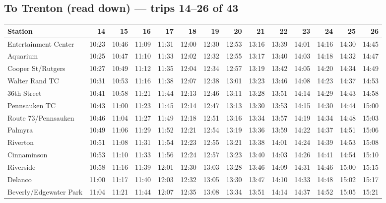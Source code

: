 \subsection*{To Trenton (read down) --- trips 14--26 of 43}
\begin{center}\footnotesize\setlength{\tabcolsep}{3pt}\begin{tabular}{@{}lrrrrrrrrrrrrr@{}}\toprule
Station & 14 & 15 & 16 & 17 & 18 & 19 & 20 & 21 & 22 & 23 & 24 & 25 & 26 \\\midrule
Entertainment Center & 10:23 & 10:46 & 11:09 & 11:31 & 12:00 & 12:30 & 12:53 & 13:16 & 13:39 & 14:01 & 14:16 & 14:30 & 14:45 \\
Aquarium & 10:25 & 10:47 & 11:10 & 11:33 & 12:02 & 12:32 & 12:55 & 13:17 & 13:40 & 14:03 & 14:18 & 14:32 & 14:47 \\
Cooper St/Rutgers & 10:27 & 10:49 & 11:12 & 11:35 & 12:04 & 12:34 & 12:57 & 13:19 & 13:42 & 14:05 & 14:20 & 14:34 & 14:49 \\
Walter Rand TC & 10:31 & 10:53 & 11:16 & 11:38 & 12:07 & 12:38 & 13:01 & 13:23 & 13:46 & 14:08 & 14:23 & 14:37 & 14:53 \\
36th Street & 10:41 & 10:58 & 11:21 & 11:44 & 12:13 & 12:46 & 13:11 & 13:28 & 13:51 & 14:14 & 14:29 & 14:43 & 14:58 \\
Pennsauken TC & 10:43 & 11:00 & 11:23 & 11:45 & 12:14 & 12:47 & 13:13 & 13:30 & 13:53 & 14:15 & 14:30 & 14:44 & 15:00 \\
Route 73/Pennsauken & 10:46 & 11:04 & 11:27 & 11:49 & 12:18 & 12:51 & 13:16 & 13:34 & 13:57 & 14:19 & 14:34 & 14:48 & 15:03 \\
Palmyra & 10:49 & 11:06 & 11:29 & 11:52 & 12:21 & 12:54 & 13:19 & 13:36 & 13:59 & 14:22 & 14:37 & 14:51 & 15:06 \\
Riverton & 10:51 & 11:08 & 11:31 & 11:54 & 12:23 & 12:55 & 13:21 & 13:38 & 14:01 & 14:24 & 14:39 & 14:53 & 15:08 \\
Cinnaminson & 10:53 & 11:10 & 11:33 & 11:56 & 12:24 & 12:57 & 13:23 & 13:40 & 14:03 & 14:26 & 14:41 & 14:54 & 15:10 \\
Riverside & 10:58 & 11:16 & 11:39 & 12:01 & 12:30 & 13:03 & 13:28 & 13:46 & 14:09 & 14:31 & 14:46 & 15:00 & 15:15 \\
Delanco & 11:00 & 11:17 & 11:40 & 12:03 & 12:32 & 13:05 & 13:30 & 13:47 & 14:10 & 14:33 & 14:48 & 15:02 & 15:17 \\
Beverly/Edgewater Park & 11:04 & 11:21 & 11:44 & 12:07 & 12:35 & 13:08 & 13:34 & 13:51 & 14:14 & 14:37 & 14:52 & 15:05 & 15:21 \\

\end{tabular}
\end{center}

